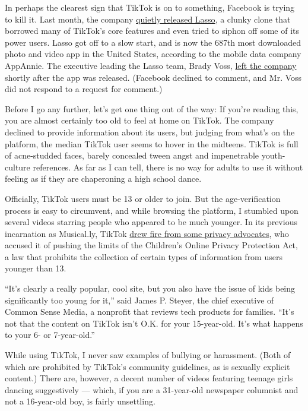 In perhaps the clearest sign that TikTok is on to something, Facebook is
trying to kill it. Last month, the company
\href{https://www.theverge.com/2018/11/9/18080280/facebook-lasso-tiktok-competitor-app}{quietly
released Lasso}, a clunky clone that borrowed many of TikTok's core
features and even tried to siphon off some of its power users. Lasso got
off to a slow start, and is now the 687th most downloaded photo and
video app in the United States, according to the mobile data company
AppAnnie. The executive leading the Lasso team, Brady Voss,
\href{https://techcrunch.com/2018/11/13/facebook-lasso/}{left the
company} shortly after the app was released. (Facebook declined to
comment, and Mr. Voss did not respond to a request for comment.)

Before I go any further, let's get one thing out of the way: If you're
reading this, you are almost certainly too old to feel at home on
TikTok. The company declined to provide information about its users, but
judging from what's on the platform, the median TikTok user seems to
hover in the midteens. TikTok is full of acne-studded faces, barely
concealed tween angst and impenetrable youth-culture references. As far
as I can tell, there is no way for adults to use it without feeling as
if they are chaperoning a high school dance.

Officially, TikTok users must be 13 or older to join. But the
age-verification process is easy to circumvent, and while browsing the
platform, I stumbled upon several videos starring people who appeared to
be much younger. In its previous incarnation as Musical.ly, TikTok
\href{https://www.nytimes.com/2016/09/17/business/media/a-social-network-frequented-by-children-tests-the-limits-of-online-regulation.html}{drew
fire from some privacy advocates}, who accused it of pushing the limits
of the Children's Online Privacy Protection Act, a law that prohibits
the collection of certain types of information from users younger than
13.

``It's clearly a really popular, cool site, but you also have the issue
of kids being significantly too young for it,'' said James P. Steyer,
the chief executive of Common Sense Media, a nonprofit that reviews tech
products for families. ``It's not that the content on TikTok isn't O.K.
for your 15-year-old. It's what happens to your 6- or 7-year-old.''

While using TikTok, I never saw examples of bullying or harassment.
(Both of which are prohibited by TikTok's community guidelines, as is
sexually explicit content.) There are, however, a decent number of
videos featuring teenage girls dancing suggestively --- which, if you
are a 31-year-old newspaper columnist and not a 16-year-old boy, is
fairly unsettling.

